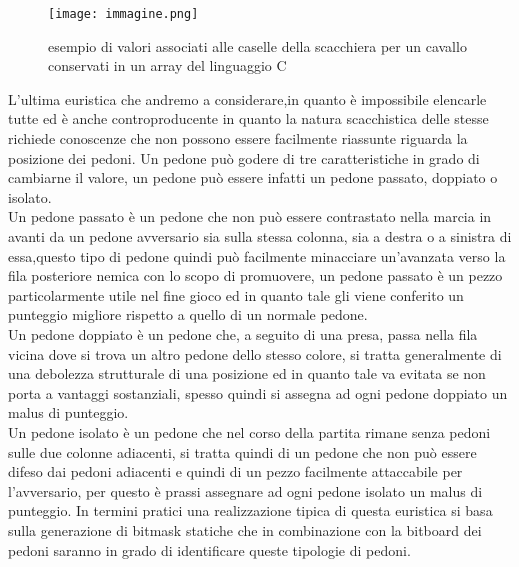 \begin{figure}
    \centering
    \texttt{[image: immagine.png]}
    \caption{esempio di valori associati alle caselle della scacchiera per un cavallo conservati in un array del linguaggio C}
\end{figure}

L'ultima euristica che andremo a considerare,in quanto è impossibile elencarle tutte ed è anche controproducente in quanto la natura scacchistica delle stesse richiede conoscenze che non possono essere facilmente riassunte
riguarda la posizione dei pedoni. Un pedone può godere di tre caratteristiche in grado di cambiarne il valore, un pedone può essere infatti  un pedone passato, doppiato o isolato.\\
Un pedone passato è un pedone che non può essere contrastato nella marcia in avanti da un pedone avversario sia sulla stessa colonna, sia a destra o a sinistra di essa,questo tipo di pedone quindi può facilmente 
minacciare un'avanzata verso la fila posteriore nemica con lo scopo di promuovere, un pedone passato è un pezzo particolarmente utile nel fine gioco ed in quanto tale gli viene conferito un punteggio migliore
rispetto a quello di un normale pedone.\\ 
Un pedone doppiato è un pedone che, a seguito di una presa, passa nella fila vicina dove si trova un altro pedone dello stesso colore, si tratta generalmente di una debolezza strutturale di una posizione 
ed in quanto tale va evitata se non porta a vantaggi sostanziali, spesso quindi si assegna ad ogni pedone doppiato un malus di punteggio.\\
Un pedone isolato è un pedone che nel corso della partita rimane senza pedoni sulle due colonne adiacenti, si tratta quindi di un pedone che non può essere difeso dai pedoni adiacenti e quindi di un pezzo
facilmente attaccabile per l'avversario, per questo è prassi assegnare ad ogni pedone isolato un malus di punteggio.
In termini pratici una realizzazione tipica di questa euristica si basa sulla generazione di bitmask statiche che in combinazione con la bitboard dei pedoni saranno in grado di identificare queste tipologie di pedoni.



